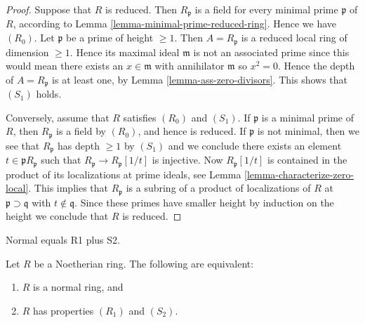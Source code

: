 \begin{proof}
Suppose that $R$ is reduced. Then $R_{\mathfrak p}$ is a field for
every minimal prime $\mathfrak p$ of $R$, according to
Lemma \ref{lemma-minimal-prime-reduced-ring}. Hence we have $(R_0)$.
Let $\mathfrak p$ be a prime of height $\geq 1$. Then $A = R_{\mathfrak p}$
is a reduced local ring of dimension $\geq 1$. Hence its maximal
ideal $\mathfrak m$ is not an associated prime
since this would mean there exists an $x \in \mathfrak m$
with annihilator $\mathfrak m$ so $x^2 = 0$. Hence the depth of
$A = R_{\mathfrak p}$ is at least one, by Lemma \ref{lemma-ass-zero-divisors}.
This shows that $(S_1)$ holds.

\medskip\noindent
Conversely, assume that $R$ satisfies $(R_0)$ and $(S_1)$.
If $\mathfrak p$ is a minimal prime of $R$, then
$R_{\mathfrak p}$ is a field by $(R_0)$, and hence is reduced.
If $\mathfrak p$ is not minimal, then we see that $R_{\mathfrak p}$
has depth $\geq 1$ by $(S_1)$ and we conclude there exists an element
$t \in \mathfrak pR_{\mathfrak p}$ such that
$R_{\mathfrak p} \to R_{\mathfrak p}[1/t]$ is injective.
Now $R_\mathfrak p[1/t]$ is contained in the product
of its localizations at prime ideals, see
Lemma \ref{lemma-characterize-zero-local}.
This implies that $R_{\mathfrak p}$ is a subring of a product of
localizations of $R$ at $\mathfrak p \supset \mathfrak q$ with
$t \not \in \mathfrak q$. Since these primes have smaller height
by induction on the height we conclude that $R$ is reduced.
\end{proof}

\begin{lemma}
\label{lemma-criterion-normal}
\begin{reference}
\cite[IV, Theorem 5.8.6]{EGA}
\end{reference}
\begin{slogan}
Normal equals R1 plus S2.
\end{slogan}
Let $R$ be a Noetherian ring.
The following are equivalent:
\begin{enumerate}
\item $R$ is a normal ring, and
\item $R$ has properties $(R_1)$ and $(S_2)$.
\end{enumerate}
\end{lemma}

